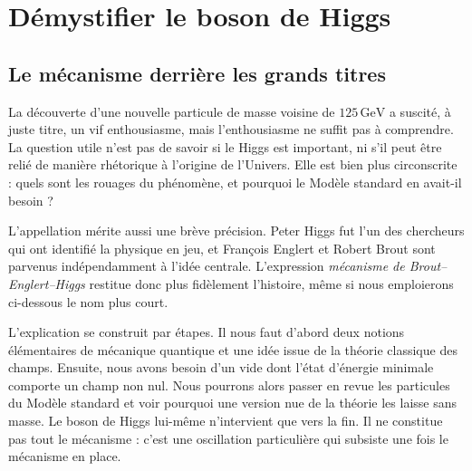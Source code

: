 \chapter{Démystifier le boson de Higgs}


\section{Le mécanisme derrière les grands titres}

La découverte d’une nouvelle particule de masse voisine de $125\,\mathrm{GeV}$ a suscité, à juste titre, un vif enthousiasme, mais l’enthousiasme ne suffit pas à comprendre. La question utile n’est pas de savoir si le Higgs est important, ni s’il peut être relié de manière rhétorique à l’origine de l’Univers. Elle est bien plus circonscrite : quels sont les rouages du phénomène, et pourquoi le Modèle standard en avait-il besoin ?

L’appellation mérite aussi une brève précision. Peter Higgs fut l’un des chercheurs qui ont identifié la physique en jeu, et Fran\c{c}ois Englert et Robert Brout sont parvenus indépendamment à l’idée centrale. L’expression \emph{mécanisme de Brout--Englert--Higgs} restitue donc plus fidèlement l’histoire, même si nous emploierons ci-dessous le nom plus court.

L’explication se construit par étapes. Il nous faut d’abord deux notions élémentaires de mécanique quantique et une idée issue de la théorie classique des champs. Ensuite, nous avons besoin d’un vide dont l’état d’énergie minimale comporte un champ non nul. Nous pourrons alors passer en revue les particules du Modèle standard et voir pourquoi une version nue de la théorie les laisse sans masse. Le boson de Higgs lui-même n’intervient que vers la fin. Il ne constitue pas tout le mécanisme : c’est une oscillation particulière qui subsiste une fois le mécanisme en place.

